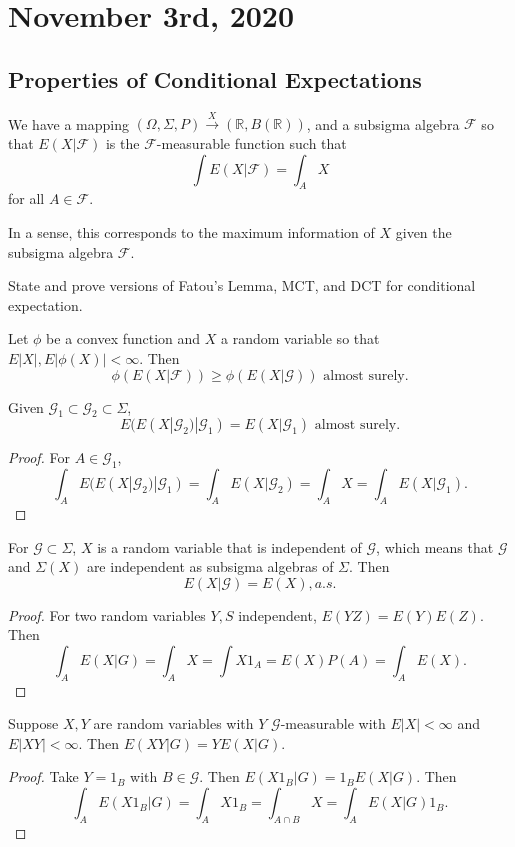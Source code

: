 \documentclass[11pt]{scrartcl}
\newcommand{\R}{\mathbb{R}}
\begin{document}
\section{November 3rd, 2020}
\subsection{Properties of Conditional Expectations}
We have a mapping $(\Omega, \Sigma, P) \xrightarrow{X} (\R, B(\R))$, and a subsigma algebra $\mathcal F$ so that $E(X|\mathcal F)$ is the $\mathcal F$-measurable function such that 
$$\int E(X|\mathcal F) = \int_A X$$
for all $A \in \mathcal F$.


\begin{remark} 
In a sense, this corresponds to the maximum information of $X$ given the subsigma algebra $\mathcal F$.  
\end{remark}

\begin{exercise}
 State and prove versions of Fatou's Lemma, MCT, and DCT for conditional expectation.
\end{exercise}
\begin{thm} Let $\phi$ be a convex function and $X$ a random variable so that $E|X|, E|\phi(X)| < \infty$.  Then
$$\phi(E(X|\mathcal F)) \ge \phi(E(X | \mathcal G)) \text{ almost surely.}$$
\end{thm}

\begin{thm} Given $\mathcal G_1 \subset \mathcal G_2 \subset \Sigma$,
$$E(E(X|\mathcal G_2)|\mathcal G_1) = E(X|\mathcal G_1) \text{ almost surely.}$$
\end{thm}
\begin{proof}
For $A \in \mathcal G_1$,
$$\int_A E(E(X|\mathcal G_2)|\mathcal G_1) = \int_A E(X|\mathcal G_2) = \int_A X = \int_A E(X|\mathcal G_1).$$
\end{proof}

\begin{thm}  For $\mathcal G \subset \Sigma$, $X$ is a random variable that is independent of $\mathcal G$, which means that $\mathcal G$ and $\Sigma(X)$ are independent as subsigma algebras of $\Sigma$.  Then 
$$E(X|\mathcal G) = E(X), a.s.$$
\end{thm}
\begin{proof}
For two random variables $Y, S$ independent, $E(YZ) = E(Y)E(Z)$.  Then 
$$\int_A E(X|G) = \int_A X = \int X1_A = E(X)P(A) = \int_A E(X).$$
\end{proof}
\begin{thm}  Suppose $X, Y$ are random variables with $Y$ $\mathcal G$-measurable with $E|X| < \infty$ and $E|XY| < \infty$.  Then $E(XY|G) = YE(X|G)$.  
\end{thm}
\begin{proof}
Take $Y=1_B$ with $B \in \mathcal G$.  Then $E(X1_B|G) = 1_BE(X|G)$.  Then 
$$\int_A E(X1_B|G) = \int_A X1_B = \int_{A \cap B} X= \int_A E(X|G)1_B.$$
\end{proof}
\end{document}
